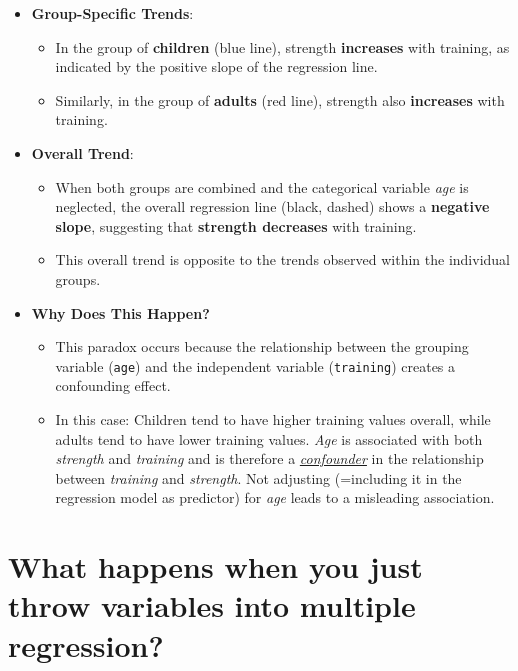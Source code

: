 \documentclass[
]{book}
\providecommand{\tightlist}{%
  \setlength{\itemsep}{0pt}\setlength{\parskip}{0pt}}
\begin{document}
\begin{itemize}
\tightlist
\item
  \textbf{Group-Specific Trends}:

  \begin{itemize}
  \tightlist
  \item
    In the group of \textbf{children} (blue line), strength \textbf{increases} with training, as indicated by the positive slope of the regression line.
  \item
    Similarly, in the group of \textbf{adults} (red line), strength also \textbf{increases} with training.
  \end{itemize}
\item
  \textbf{Overall Trend}:

  \begin{itemize}
  \tightlist
  \item
    When both groups are combined and the categorical variable \emph{age} is neglected,
    the overall regression line (black, dashed) shows a \textbf{negative slope}, suggesting that \textbf{strength decreases} with training.
  \item
    This overall trend is opposite to the trends observed within the individual groups.
  \end{itemize}
\item
  \textbf{Why Does This Happen?}

  \begin{itemize}
  \tightlist
  \item
    This paradox occurs because the relationship between the grouping variable (\texttt{age}) and the independent variable (\texttt{training}) creates a confounding effect.
  \item
    In this case: Children tend to have higher training values overall,
    while adults tend to have lower training values. \emph{Age} is associated with both \emph{strength} and \emph{training} and
    is therefore a \href{https://en.wikipedia.org/wiki/Confounding}{\emph{confounder}} in the relationship between \emph{training} and \emph{strength}.
    Not adjusting (=including it in the regression model as predictor) for \emph{age} leads to a misleading association.
  \end{itemize}
\end{itemize}

\section{What happens when you just throw variables into multiple regression?}\label{throwing_variables}
\end{document}

